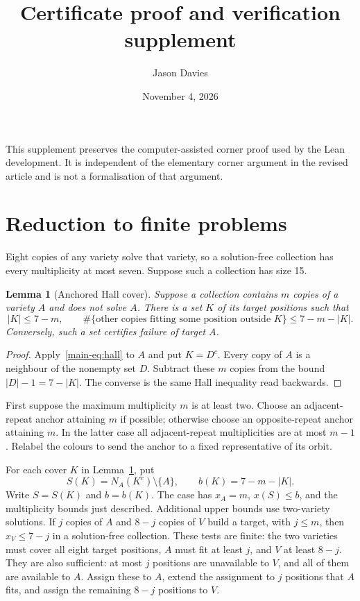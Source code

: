 \documentclass[11pt]{article}
\title{Certificate proof and verification supplement}
\author{Jason Davies}
\date{November 4, 2026}
\newtheorem{lemma}[theorem]{Lemma}
\theoremstyle{remark}
\begin{document}
\maketitle
This supplement preserves the computer-assisted corner proof used by the
Lean development. It is independent of the elementary corner argument in
the revised article and is not a formalisation of that argument.

\section{Reduction to finite problems}\label{sec:cases}
Eight copies of any variety solve that variety, so a solution-free collection
has every multiplicity at most seven. Suppose such a collection has size 15.

\begin{lemma}[Anchored Hall cover]\label{lem:anchor}
Suppose a collection contains $m$ copies of a variety $A$ and does not solve
$A$. There is a set $K$ of its target positions such that
\begin{equation}\label{eq:anchor}
 |K|\le 7-m,\qquad
 \#\{\text{other copies fitting some position outside }K\}
       \le 7-m-|K|.
\end{equation}
Conversely, such a set certifies failure of target $A$.
\end{lemma}
\begin{proof}
Apply~\eqref{main-eq:hall} to $A$ and put $K=D^c$. Every copy of $A$ is a
neighbour of the nonempty set $D$. Subtract these $m$ copies from the bound
$|D|-1=7-|K|$. The converse is the same Hall inequality read backwards.
\end{proof}

First suppose the maximum multiplicity $m$ is at least two. Choose an
adjacent-repeat anchor attaining $m$ if possible; otherwise choose an
opposite-repeat anchor attaining $m$. In the latter case all adjacent-repeat
multiplicities are at most $m-1$. Relabel the colours to send the anchor to
a fixed representative of its orbit.

For each cover $K$ in Lemma~\ref{lem:anchor}, put
\[
 S(K)=N_A(K^c)\setminus\{A\},\qquad b(K)=7-m-|K|.
\]
Write $S=S(K)$ and $b=b(K)$. The case has
$x_A=m$, $x(S)\le b$, and the multiplicity bounds just described.
Additional upper bounds use two-variety solutions. If $j$ copies of $A$
and $8-j$ copies of $V$ build a target, with $j\le m$, then
$x_V\le 7-j$ in a solution-free collection. These tests are finite:
the two varieties must cover all eight target positions, $A$ must fit at
least $j$, and $V$ at least $8-j$. They are also sufficient: at most $j$
positions are unavailable to $V$,
and all of them are available to $A$. Assign these to $A$, extend the
assignment to $j$ positions that $A$ fits, and assign the remaining
$8-j$ positions to $V$.
\end{document}
